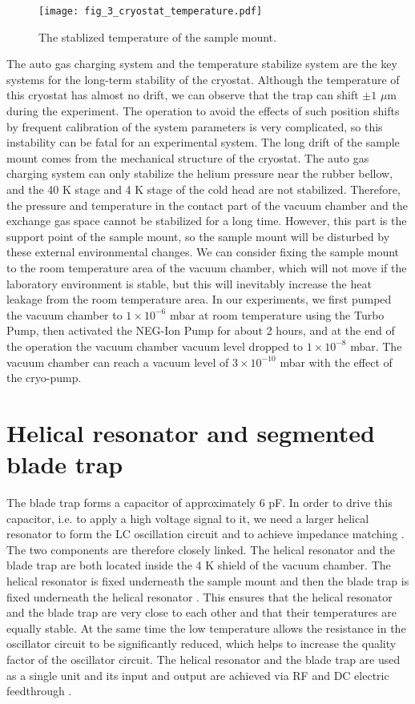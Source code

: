 \begin{figure}
    \centering
    \texttt{[image: fig\_3\_cryostat\_temperature.pdf]}
    \caption{The stablized temperature of the sample mount.}
    \label{fig:cryostat_temperature}
\end{figure}

The auto gas charging system and the temperature stabilize system are the key systems for the long-term stability of the cryostat. Although the temperature of this cryostat has almost no drift, we can observe that the trap can shift $\pm 1$ $\mu$m during the experiment. The operation to avoid the effects of such position shifts by frequent calibration of the system parameters is very complicated, so this instability can be fatal for an experimental system. The long drift of the sample mount comes from the mechanical structure of the cryostat. The auto gas charging system can only stabilize the helium pressure near the rubber bellow, and the 40 K stage and 4 K stage of the cold head are not stabilized. Therefore, the pressure and temperature in the contact part of the vacuum chamber and the exchange gas space cannot be stabilized for a long time. However, this part is the support point of the sample mount, so the sample mount will be disturbed by these external environmental changes. We can consider fixing the sample mount to the room temperature area of the vacuum chamber, which will not move if the laboratory environment is stable, but this will inevitably increase the heat leakage from the room temperature area. In our experiments, we first pumped the vacuum chamber to $1 \times {10}^{-6}$ mbar at room temperature using the Turbo Pump, then activated the NEG-Ion Pump for about 2 hours, and at the end of the operation the vacuum chamber vacuum level dropped to $1 \times {10}^{-8}$ mbar. The vacuum chamber can reach a vacuum level of $3 \times {10}^{-10}$ mbar with the effect of the cryo-pump.



\section{Helical resonator and segmented blade trap}

The blade trap forms a capacitor of approximately 6 pF. In order to drive this capacitor, i.e. to apply a high voltage signal to it, we need a larger helical resonator to form the LC oscillation circuit and to achieve impedance matching \cite{RN267,RN262,RN263,RN308,RN265}. The two components are therefore closely linked. The helical resonator and the blade trap are both located inside the 4 K shield of the vacuum chamber. The helical resonator is fixed underneath the sample mount and then the blade trap is fixed underneath the helical resonator \cite{RN92,RN258,RN286,RN345}. This ensures that the helical resonator and the blade trap are very close to each other and that their temperatures are equally stable. At the same time the low temperature allows the resistance in the oscillator circuit to be significantly reduced, which helps to increase the quality factor of the oscillator circuit. The helical resonator and the blade trap are used as a single unit and its input and output are achieved via RF and DC electric feedthrough \cite{RN266}.

